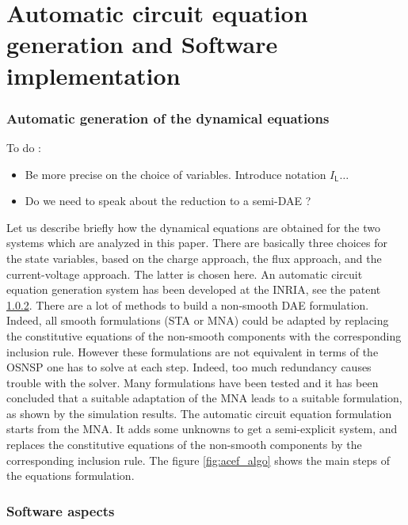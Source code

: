 \section{Automatic circuit equation generation and Software implementation}

\subsubsection{Automatic generation of the dynamical equations}

\begin{ndrva}
  To do :
  \begin{itemize}
  \item Be more precise on the choice of variables. Introduce notation $I_{\mathsf L} \ldots$
  \item Do we need to speak about the reduction to a semi-DAE ?
  \end{itemize}
\end{ndrva}


Let us describe briefly how the dynamical equations are obtained for the two systems which are analyzed in this paper. There are basically three choices for the state variables, based on the charge approach, the flux approach, and the current-voltage approach. The latter is chosen here. An automatic circuit equation generation system has been developed at the INRIA, see the patent \ref{}.  There are a lot of methods to build a non-smooth DAE formulation. Indeed, all smooth formulations (STA or MNA) could be adapted by replacing the constitutive equations of the non-smooth components
with the corresponding inclusion rule. However these formulations are not equivalent in terms of the OSNSP one has to solve at each step. Indeed, too much redundancy causes trouble with the solver. Many formulations have been tested and it has been concluded that a suitable adaptation of the MNA leads to a suitable formulation, as shown by the simulation results. The automatic circuit equation formulation starts from the MNA. It adds some unknowns to get a semi-explicit system, and replaces the constitutive equations of the non-smooth components by
the corresponding inclusion rule. The figure \ref{fig:acef_algo} shows the main steps of the equations formulation.



\subsubsection{Software aspects}



